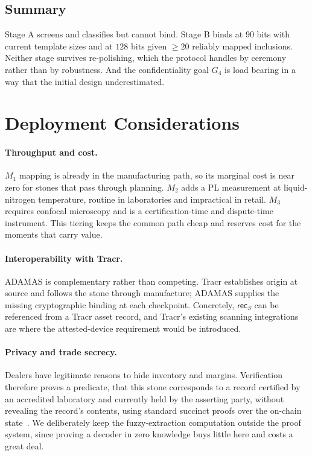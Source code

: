 \documentclass[10pt,twocolumn]{article}
\theoremstyle{remark}
\begin{document}
\subsection{Summary}

Stage A screens and classifies but cannot bind. Stage B binds at $90$ bits with
current template sizes and at $128$ bits given $\geq 20$ reliably mapped
inclusions. Neither stage survives re-polishing, which the protocol handles by
ceremony rather than by robustness. And the confidentiality goal $G_4$ is load
bearing in a way that the initial design underestimated.

\section{Deployment Considerations}
\label{sec:deploy}

\paragraph{Throughput and cost.} $M_1$ mapping is already in the manufacturing
path, so its marginal cost is near zero for stones that pass through planning.
$M_2$ adds a PL measurement at liquid-nitrogen temperature, routine in
laboratories and impractical in retail. $M_3$ requires confocal microscopy and
is a certification-time and dispute-time instrument. This tiering keeps the
common path cheap and reserves cost for the moments that carry value.

\paragraph{Interoperability with Tracr.} ADAMAS is complementary rather than
competing. Tracr establishes origin at source and follows the stone through
manufacture; ADAMAS supplies the missing cryptographic binding at each
checkpoint. Concretely, $\mathsf{rec}_S$ can be referenced from a Tracr asset
record, and Tracr's existing scanning integrations~\cite{debeers_tracr_case} are
where the attested-device requirement would be introduced.

\paragraph{Privacy and trade secrecy.} Dealers have legitimate reasons to hide
inventory and margins. Verification therefore proves a predicate, that this
stone corresponds to a record certified by an accredited laboratory and
currently held by the asserting party, without revealing the record's contents,
using standard succinct proofs over the on-chain
state~\cite{groth2016,zerocash2014}. We deliberately keep the fuzzy-extraction
computation outside the proof system, since proving a decoder in zero knowledge
buys little here and costs a great deal.
\end{document}
